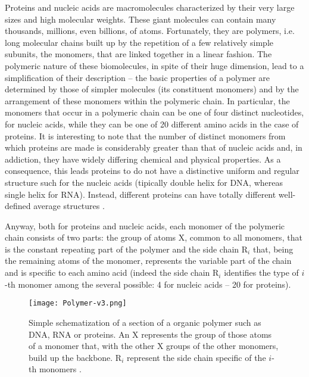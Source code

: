 Proteins and nucleic acids are macromolecules characterized by their very large sizes and high molecular weights. These giant molecules can contain many thousands, millions, even billions, of atoms. Fortunately, they are polymers, i.e. long molecular chains built up by the repetition of a few relatively simple subunits, the monomers, that are linked together in a linear fashion. The polymeric nature of these biomolecules, in spite of their huge dimension, lead to a simplification of their description -- the basic properties of a polymer are determined by those of simpler molecules (its constituent monomers) and by the arrangement of these monomers within the polymeric chain. In particular, the monomers that occur in a polymeric chain can be one of four distinct nucleotides, for nucleic acids, while they can be one of 20 different amino acids in the case of proteins. It is interesting to note that the number of distinct monomers from which proteins are made is considerably greater than that of nucleic acids and, in addiction, they have widely differing chemical and physical properties. As a consequence, this leads proteins to do not have a distinctive uniform and regular structure such for the nucleic acids (tipically double helix for DNA, whereas single helix for RNA). Instead, different proteins can have totally different well-defined average structures \cite{voet2016fundamentals}.

Anyway, both for proteins and nucleic acids, each monomer of the polymeric chain consists of two parts: 
the group of atoms X, common to all monomers, that  is the constant repeating part of the polymer and the side chain R$_i$ that, being  the remaining atoms of the monomer, represents the variable part of the chain and is specific to each amino acid (indeed the side chain R$_i$ identifies the type of $i$-th monomer among the several possible: 4 for nucleic acids -- 20 for proteins).

\begin{figure}[h]
\centering
\begin{minipage}[t]{0.8\textwidth}
\centering
\texttt{[image: Polymer-v3.png]}

\caption{\small{Simple schematization of a section of a organic polymer such as DNA, RNA or proteins. An X represents the group of those atoms of a monomer that, with the other X groups of the other monomers, build up the backbone. R$_i$ represent the side chain specific of the $i$-th monomers
 \cite{creighton2010biophysical}.}}

\label{fig:Polymer}
\end{minipage} 
\end{figure}

